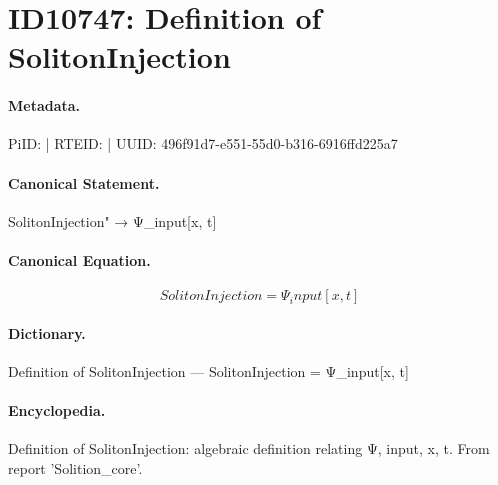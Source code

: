 \section*{ID10747: Definition of SolitonInjection}
\paragraph{Metadata.}
PiID:  | RTEID:  | UUID: 496f91d7-e551-55d0-b316-6916ffd225a7

\paragraph{Canonical Statement.}
SolitonInjection" → Ψ\_input[x, t]

\paragraph{Canonical Equation.}
\[
SolitonInjection = Ψ_input[x, t]
\]

\paragraph{Dictionary.}
Definition of SolitonInjection — SolitonInjection = Ψ\_input[x, t]

\paragraph{Encyclopedia.}
Definition of SolitonInjection: algebraic definition relating Ψ, input, x, t. From report 'Solition\_core'.
